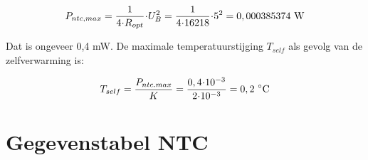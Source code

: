 \documentclass[12pt,a4paper,final,twoside,fleqn]{article}
\newcommand{\rntc}{R_\text{NTC}}
\newcommand{\ropt}{R_{opt}}
\let\oldcdot\cdot
\renewcommand{\cdot}{\kern-.10em\oldcdot\kern-.10em}
\begin{document}
\begin{equation}
P_{ntc,max} = \dfrac{1}{4\cdot \ropt}\cdot U_B^2 = \dfrac{1}{4\cdot 16218}\cdot 5^2 =
0,000385374\ \text{W}
\end{equation}

Dat is ongeveer 0,4 mW. De maximale temperatuurstijging $T_{self}$ als gevolg van de
 zelfverwarming is:
 
\begin{equation}
T_{self} = \dfrac{P_{ntc.max}}{K} = \dfrac{0,4\cdot10^{-3}}{2\cdot10^{-3}}=0,2\ ^\circ\text{C}
\end{equation}


\appendix

\clearpage
\section{Gegevenstabel NTC}
\end{document}
